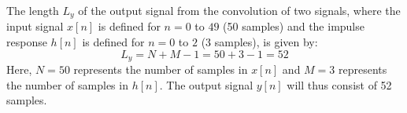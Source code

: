 
\item[(a)]
The length $L_y$ of the output signal from the convolution of two signals, where the input signal $x[n]$ is defined for
$n = 0$ to $49$ (50 samples) and the impulse response $h[n]$ is defined for $n = 0$ to $2$ (3 samples), is given by:
$$
L_y = N + M - 1 = 50 + 3 - 1 = 52
$$
Here, $N = 50$ represents the number of samples in $x[n]$ and $M = 3$ represents the number of samples in $h[n]$.
The output signal $y[n]$ will thus consist of 52 samples.
